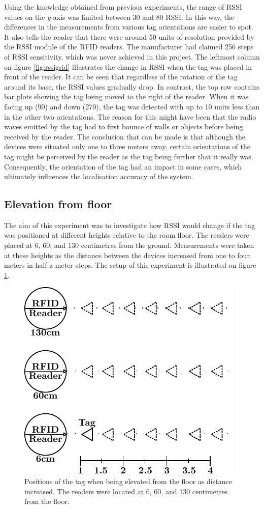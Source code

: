 Using the knowledge obtained from previous experiments, the range of RSSI values on the $y$-axis was limited between 30 and 80 RSSI. In this way, the differences in the measurements from various tag orientations are easier to spot. It also tells the reader that there were around 50 units of resolution provided by the RSSI module of the RFID readers. The manufacturer had claimed 256 steps of RSSI sensitivity, which was never achieved in this project. The leftmost column on figure \ref{fig:rssigrid} illustrates the change in RSSI when the tag was placed in front of the reader. It can be seen that regardless of the rotation of the tag around its base, the RSSI values gradually drop. In contrast, the top row contains bar plots showing the tag being moved to the right of the reader. When it was facing up (90\textdegree) and down (270\textdegree), the tag was detected with up to 10 units less than in the other two orientations. The reason for this might have been that the radio waves emitted by the tag had to first bounce of walls or objects before being received by the reader. The conclusion that can be made is that although the devices were situated only one to three meters away, certain orientations of the tag might be perceived by the reader as the tag being further that it really was. Consequently, the orientation of the tag had an impact in some cases, which ultimately influences the localisation accuracy of the system.


\subsection{Elevation from floor}

The aim of this experiment was to investigate how RSSI would change if the tag was positioned at different heights relative to the room floor. The readers were placed at 6, 60, and 130 centimetres from the ground. Measurements were taken at these heights as the distance between the devices increased from one to four meters in half a meter steps. The setup of this experiment is illustrated on figure \ref{fig:ele}.
\begin{figure}[h]
	\begin{center}
		\includegraphics[width=.4\textwidth]{figures/exp/elevation}
		\caption{Positions of the tag when being elevated from the floor as distance increased. The readers were located at 6, 60, and 130 centimetres from the floor.}
		\label{fig:ele}
	\end{center}
\end{figure}


